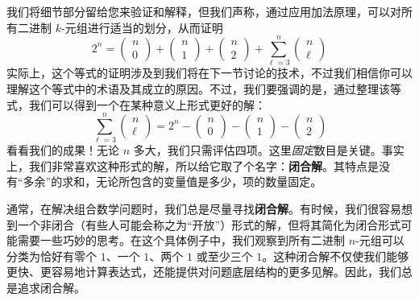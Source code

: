 \begin{example}
    我们将细节部分留给您来验证和解释，但我们声称，通过应用加法原理，可以对所有二进制 $k$-元组进行适当的划分，从而证明
    \[2^n = \begin{pmatrix}
            n \\
            0
        \end{pmatrix} + \begin{pmatrix}
            n \\
            1
        \end{pmatrix} + \begin{pmatrix}
            n \\
            2
        \end{pmatrix} + \sum_{\ell = 3}^{n} \begin{pmatrix}
            n \\
            \ell
        \end{pmatrix}\]
    实际上，这个等式的证明涉及到我们将在下一节讨论的技术，不过我们相信你可以理解这个等式中的术语及其成立的原因。不过，我们要强调的是，通过整理该等式，我们可以得到一个在某种意义上形式更好的解：
    \[\sum_{\ell = 3}^{n} \begin{pmatrix}
            n \\
            \ell
        \end{pmatrix} = 2^n - \begin{pmatrix}
            n \\
            0
        \end{pmatrix} - \begin{pmatrix}
            n \\
            1
        \end{pmatrix} - \begin{pmatrix}
            n \\
            2
        \end{pmatrix}\]
    看看我们的成果！无论 $n$ 多大，我们只需评估四项。这里\emph{固定}数目是关键。事实上，我们非常喜欢这种形式的解，所以给它取了个名字：\textbf{闭合解}。其特点是没有``多余''的求和，无论所包含的变量值是多少，项的数量固定。

    通常，在解决组合数学问题时，我们总是尽量寻找\textbf{闭合解}。有时候，我们很容易想到一个非闭合（有些人可能会称之为``开放''）形式的解，但将其简化为闭合形式可能需要一些巧妙的思考。在这个具体例子中，我们观察到所有二进制 $n$-元组可以分类为恰好有零个 $1$、一个 $1$、两个 $1$ 或至少三个 $1$。这种闭合解不仅使我们能够更快、更容易地计算表达式，还能提供对问题底层结构的更多见解。因此，我们总是追求闭合解。


\end{example}
